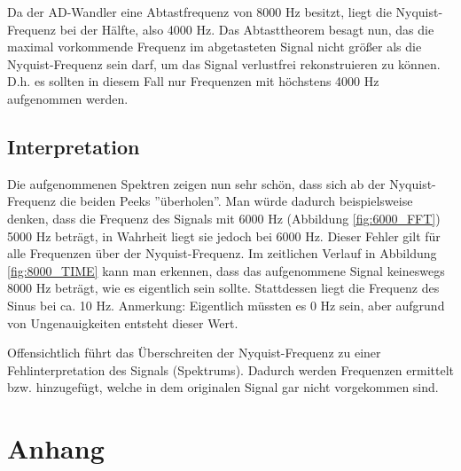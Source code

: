 \documentclass[12pt,oneside,a4paper]{report}
\begin{document}
Da der AD-Wandler eine Abtastfrequenz von 8000 Hz besitzt, liegt die Nyquist-Frequenz bei der Hälfte, also 4000 Hz.
Das Abtasttheorem besagt nun, das die maximal vorkommende Frequenz im abgetasteten Signal nicht größer als die Nyquist-Frequenz sein darf, um das Signal verlustfrei rekonstruieren zu können. D.h. es sollten in diesem Fall nur Frequenzen mit höchstens 4000 Hz aufgenommen werden.

\section{Interpretation}
\label{chap:VERSUCH_4_INTERPRETATION}

Die aufgenommenen Spektren zeigen nun sehr schön, dass sich ab der Nyquist-Frequenz die beiden Peeks ''überholen''.
Man würde dadurch beispielsweise denken, dass die Frequenz des Signals mit 6000 Hz (Abbildung \ref{fig:6000_FFT}) 5000 Hz beträgt, in Wahrheit liegt sie jedoch bei 6000 Hz.
Dieser Fehler gilt für alle Frequenzen über der Nyquist-Frequenz.
Im zeitlichen Verlauf in Abbildung \ref{fig:8000_TIME} kann man erkennen, dass das aufgenommene Signal keineswegs 8000 Hz beträgt, wie es eigentlich sein sollte. Stattdessen liegt die Frequenz des Sinus bei ca. 10 Hz.
Anmerkung: Eigentlich müssten es 0 Hz sein, aber aufgrund von Ungenauigkeiten entsteht dieser Wert.

Offensichtlich führt das Überschreiten der Nyquist-Frequenz zu einer Fehlinterpretation des Signals (Spektrums). Dadurch werden Frequenzen ermittelt bzw. hinzugefügt, welche in dem originalen Signal gar nicht vorgekommen sind.

%
%
\renewcommand\thesection{A.\arabic{section}}
\renewcommand\thesubsection{\thesection.\arabic{subsection}}

\chapter*{Anhang}
\label{chap:APPENDIX}
\addtocounter{chapter}{1}
\setcounter{section}{0}
\end{document}
